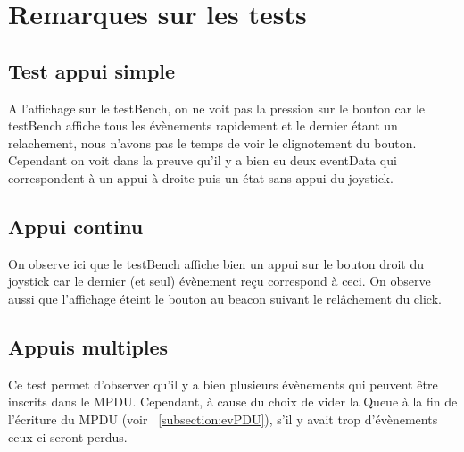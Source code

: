\documentclass{report}
\begin{document}
\section{Remarques sur les tests}
\subsection{Test appui simple}
\label{subsection:AppuiSimple}
A l'affichage sur le testBench, on ne voit pas la pression sur le bouton car le testBench affiche tous les évènements rapidement et le dernier étant un relachement, nous n'avons pas le temps de voir le clignotement du bouton. Cependant on voit dans la preuve qu'il y a bien eu deux eventData qui correspondent à un appui à droite puis un état sans appui du joystick.
\subsection{Appui continu}
\label{subsection:AppuiContinu}
On observe ici que le testBench affiche bien un appui sur le bouton droit du joystick car le dernier (et seul) évènement reçu correspond à ceci. On observe aussi que l'affichage éteint le bouton au beacon suivant le relâchement du click.
\subsection{Appuis multiples}
\label{subsection:AppuisMultiples}
Ce test permet d'observer qu'il y a bien plusieurs évènements qui peuvent être inscrits dans le MPDU. Cependant, à cause du choix de vider la Queue à la fin de l'écriture du MPDU (voir ~\ref{subsection:evPDU}), s'il y avait trop d'évènements ceux-ci seront perdus.
\end{document}
